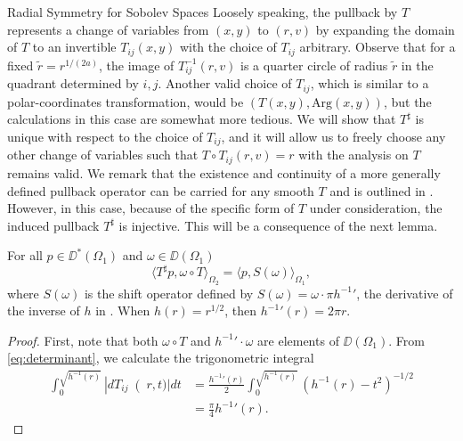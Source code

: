 \begin{chapter}{Radial Symmetry for Sobolev Spaces}
Loosely speaking, the pullback by $T$ represents a change of variables from $(x,y)$ to $(r,v)$ by expanding the domain of $T$ to an invertible $T_{ij}(x,y)$ with the choice of $T_{ij}$ arbitrary.  
Observe that for a fixed $\tilde r = r^{1/(2a)}$, the image of $T_{ij}^{-1}(r,v)$ is a quarter circle of radius $\tilde r$ in the quadrant determined by $i,j$.
Another valid choice of $T_{ij}$, which is similar to a polar-coordinates transformation, would be $(T(x,y), \mathrm{Arg}(x,y))$, but the calculations in this case are somewhat more tedious.
We will show that $T^\sharp$ is unique with respect to the choice of $T_{ij}$, and it will allow us to freely choose any other change of variables such that $T \circ T_{ij}(r,v) = r$ with the analysis on $T$ remains valid.
We remark that the existence and continuity of a more generally defined pullback operator can be carried for any smooth $T$ and is outlined in \citep{hormander1983}.
However, in this case, because of the specific form of $T$ under consideration, the induced pullback $T^\sharp$ is injective. 
This will be a consequence of the next lemma.
\begin{lem} \label{lem:innerProduct}
  For all $p\in\DD^*(\Omega_1)$ and $\omega \in \DD(\Omega_1)$
  \begin{equation}
    \langle T^\sharp p , \omega \circ T \rangle_{\Omega_2} = \langle p,S(\omega)\rangle_{\Omega_1},
  \end{equation}
  where $S(\omega)$ is the shift operator defined by $S(\omega) = \omega\cdot\pi {h^{-1}}'$, the derivative of the inverse of $h$ in . 
  When $h(r) = r^{1/2}$, then ${h^{-1}}'(r) = 2\pi r$.
\end{lem}
\begin{proof}
  First, note that both $\omega \circ T$ and ${h^{-1}}'\cdot \omega$ are elements of $\DD(\Omega_1)$.  
  From \eqref{eq:determinant}, we calculate the trigonometric integral
  \begin{align}
    \int_0^{\sqrt{h^{-1}(r)}} \left|dT_{ij}\right(r,t)| dt 
    &= \frac{{h^{-1}}'(r)}2 \int_0^{\sqrt{h^{-1}(r)}}\left(h^{-1}(r) - t^2\right)^{-1/2}\nonumber\\
    &= \frac\pi4 {h^{-1}}'(r).

\end{align}
\end{proof}
\end{chapter}
